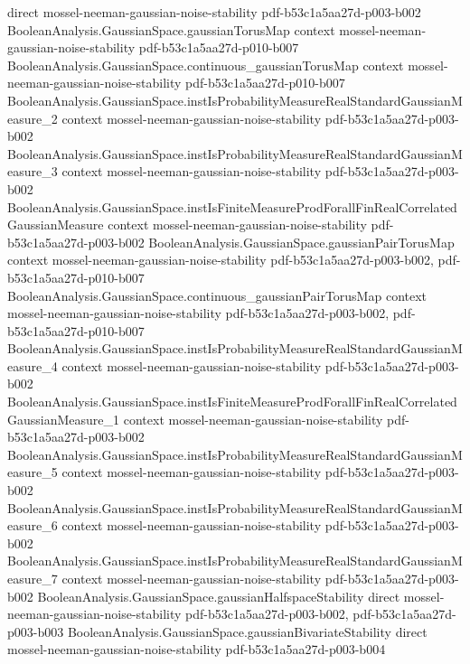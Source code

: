 \begin{theorem}
  {direct}
  {mossel-neeman-gaussian-noise-stability}
  {pdf-b53c1a5aa27d-p003-b002}
\proofstep
  {BooleanAnalysis.GaussianSpace.gaussianTorusMap}
  {context}
  {mossel-neeman-gaussian-noise-stability}
  {pdf-b53c1a5aa27d-p010-b007}
\proofstep
  {BooleanAnalysis.GaussianSpace.continuous_gaussianTorusMap}
  {context}
  {mossel-neeman-gaussian-noise-stability}
  {pdf-b53c1a5aa27d-p010-b007}
\proofstep
  {BooleanAnalysis.GaussianSpace.instIsProbabilityMeasureRealStandardGaussianMeasure_2}
  {context}
  {mossel-neeman-gaussian-noise-stability}
  {pdf-b53c1a5aa27d-p003-b002}
\proofstep
  {BooleanAnalysis.GaussianSpace.instIsProbabilityMeasureRealStandardGaussianMeasure_3}
  {context}
  {mossel-neeman-gaussian-noise-stability}
  {pdf-b53c1a5aa27d-p003-b002}
\proofstep
  {BooleanAnalysis.GaussianSpace.instIsFiniteMeasureProdForallFinRealCorrelatedGaussianMeasure}
  {context}
  {mossel-neeman-gaussian-noise-stability}
  {pdf-b53c1a5aa27d-p003-b002}
\proofstep
  {BooleanAnalysis.GaussianSpace.gaussianPairTorusMap}
  {context}
  {mossel-neeman-gaussian-noise-stability}
  {pdf-b53c1a5aa27d-p003-b002,
    pdf-b53c1a5aa27d-p010-b007}
\proofstep
  {BooleanAnalysis.GaussianSpace.continuous_gaussianPairTorusMap}
  {context}
  {mossel-neeman-gaussian-noise-stability}
  {pdf-b53c1a5aa27d-p003-b002,
    pdf-b53c1a5aa27d-p010-b007}
\proofstep
  {BooleanAnalysis.GaussianSpace.instIsProbabilityMeasureRealStandardGaussianMeasure_4}
  {context}
  {mossel-neeman-gaussian-noise-stability}
  {pdf-b53c1a5aa27d-p003-b002}
\proofstep
  {BooleanAnalysis.GaussianSpace.instIsFiniteMeasureProdForallFinRealCorrelatedGaussianMeasure_1}
  {context}
  {mossel-neeman-gaussian-noise-stability}
  {pdf-b53c1a5aa27d-p003-b002}
\proofstep
  {BooleanAnalysis.GaussianSpace.instIsProbabilityMeasureRealStandardGaussianMeasure_5}
  {context}
  {mossel-neeman-gaussian-noise-stability}
  {pdf-b53c1a5aa27d-p003-b002}
\proofstep
  {BooleanAnalysis.GaussianSpace.instIsProbabilityMeasureRealStandardGaussianMeasure_6}
  {context}
  {mossel-neeman-gaussian-noise-stability}
  {pdf-b53c1a5aa27d-p003-b002}
\proofstep
  {BooleanAnalysis.GaussianSpace.instIsProbabilityMeasureRealStandardGaussianMeasure_7}
  {context}
  {mossel-neeman-gaussian-noise-stability}
  {pdf-b53c1a5aa27d-p003-b002}
\proofstep
  {BooleanAnalysis.GaussianSpace.gaussianHalfspaceStability}
  {direct}
  {mossel-neeman-gaussian-noise-stability}
  {pdf-b53c1a5aa27d-p003-b002,
    pdf-b53c1a5aa27d-p003-b003}
\proofstep
  {BooleanAnalysis.GaussianSpace.gaussianBivariateStability}
  {direct}
  {mossel-neeman-gaussian-noise-stability}
  {pdf-b53c1a5aa27d-p003-b004}

\end{theorem}
